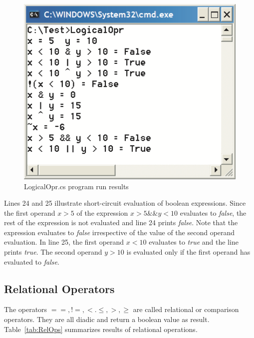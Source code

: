 \begin{figure}
\centering
\includegraphics[scale=0.55]{./CSharpBasics/Illus/LogicalOprOut}
\caption{LogicalOpr.cs program run results}
\label{fig:LogicalOprOut}
\end{figure}

Lines 24 and 25 illustrate short-circuit evaluation of boolean
expressions. Since the first operand $x > 5$ of the expression $x
> 5 \&\& y < 10$ evaluates to \emph{false}, the rest of the
expression is not evaluated and line 24 prints \emph{false}. Note
that the expression evaluates to \emph{false} irrespective of the
value of the second operand evaluation. In line 25, the first
operand $x < 10$ evaluates to \emph{true} and the line prints
\emph{true}. The second operand $y > 10$ is evaluated only if the
first operand has evaluated to \emph{false}.



\subsection{Relational Operators}

The operators $= =, !\!=, <. \leq, >, \geq$ are called relational
or comparison operators. They are all diadic and return a boolean
value as result. Table~\ref{tab:RelOps} summarizes results of
relational operations.



